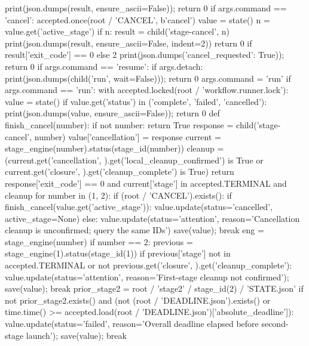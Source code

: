         print(json.dumps(result, ensure_ascii=False)); return 0
    if args.command == 'cancel':
        accepted.once(root / 'CANCEL', b'cancel\n')
        value = state()
        n = value.get('active_stage')
        if n:
            result = child('stage-cancel', n)
            print(json.dumps(result, ensure_ascii=False, indent=2))
            return 0 if result['exit_code'] == 0 else 2
        print(json.dumps({'cancel_requested': True})); return 0
    if args.command == 'resume':
        if args.detach:
            print(json.dumps(child('run', wait=False))); return 0
        args.command = 'run'
    if args.command == 'run':
        with accepted.locked(root / 'workflow.runner.lock'):
            value = state()
            if value.get('status') in ('complete', 'failed', 'cancelled'):
                print(json.dumps(value, ensure_ascii=False)); return 0
            def finish_cancel(number):
                if not number:
                    return True
                response = child('stage-cancel', number)
                value['cancellation'] = response
                current = stage_engine(number).status(stage_id(number))
                cleanup = (current.get('cancellation', {}).get('local_cleanup_confirmed') is True
                           or current.get('closure', {}).get('cleanup_complete') is True)
                return response['exit_code'] == 0 and current['stage'] in accepted.TERMINAL and cleanup
            for number in (1, 2):
                if (root / 'CANCEL').exists():
                    if finish_cancel(value.get('active_stage')):
                        value.update(status='cancelled', active_stage=None)
                    else:
                        value.update(status='attention', reason='Cancellation cleanup is unconfirmed; query the same IDs')
                    save(value); break
                eng = stage_engine(number)
                if number == 2:
                    previous = stage_engine(1).status(stage_id(1))
                    if previous['stage'] not in accepted.TERMINAL or not previous.get('closure', {}).get('cleanup_complete'):
                        value.update(status='attention', reason='First-stage cleanup not confirmed'); save(value); break
                    prior_stage2 = root / 'stage2' / stage_id(2) / 'STATE.json'
                    if not prior_stage2.exists() and (not (root / 'DEADLINE.json').exists() or time.time() >= accepted.load(root / 'DEADLINE.json')['absolute_deadline']):
                        value.update(status='failed', reason='Overall deadline elapsed before second-stage launch'); save(value); break
